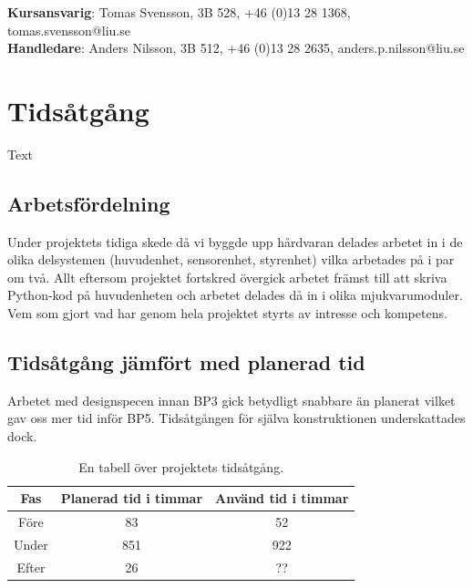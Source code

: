 \documentclass{article}
\begin{document}
\begin{center}
\textbf{Kursansvarig}: Tomas Svensson, 3B 528, +46 (0)13 28 1368, tomas.svensson@liu.se \\
\textbf{Handledare}: Anders Nilsson, 3B 512, +46 (0)13 28 2635, anders.p.nilsson@liu.se
\end{center}
\vspace*{\fill}
\clearpage

\renewcommand*\contentsname{Innehållsförteckning}
\tableofcontents

\clearpage
\section{Tidsåtgång}
Text


\subsection{Arbetsfördelning}
Under projektets tidiga skede då vi byggde upp hårdvaran delades arbetet in i de olika delsystemen (huvudenhet, sensorenhet, styrenhet) vilka arbetades på i par om två. Allt eftersom projektet fortskred övergick arbetet främst till att skriva Python-kod på huvudenheten och arbetet delades då in i olika mjukvarumoduler. Vem som gjort vad har genom hela projektet styrts av intresse och kompetens.


\subsection{Tidsåtgång jämfört med planerad tid}
Arbetet med designspecen innan BP3 gick betydligt snabbare än planerat vilket gav oss mer tid inför BP5. Tidsåtgången för själva konstruktionen underskattades dock.

\begin{table}[H]
\centering
\caption{En tabell över projektets tidsåtgång.}
\begin{tabular}{ | c | c | c | }
\hline
Fas & Planerad tid i timmar & Använd tid i timmar \\
\hline
Före & 83 & 52 \\
\hline
Under & 851 & 922 \\
\hline
Efter & 26 & ?? \\
\hline
\end{tabular}
\label{table:tidsatgang}
\end{table}
\ \\


\clearpage
\end{document}
